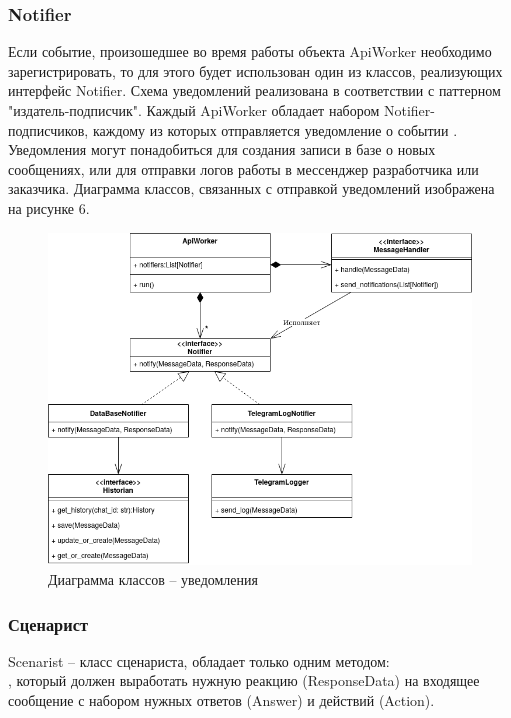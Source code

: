     \subsubsection{Notifier}
    Если событие, произошедшее во время работы объекта ApiWorker необходимо
    зарегистрировать, то для этого будет использован один из классов,
    реализующих интерфейс Notifier.
    Схема уведомлений реализована в соответствии с паттерном "издатель-подписчик".
    Каждый ApiWorker обладает набором Notifier-подписчиков, каждому из которых
    отправляется уведомление о событии .
    Уведомления могут понадобиться для создания записи в базе о новых сообщениях,
    или для отправки логов работы в мессенджер разработчика или заказчика.
    Диаграмма классов, связанных с отправкой уведомлений изображена на рисунке 6.
    \begin{figure}[H]
        \centering
        \includegraphics[width=0.9\linewidth]{static/ClassDiagram_notifiers.png}
        \caption{Диаграмма классов -- уведомления}
        \label{fig:class-diagram-notifiers}
    \end{figure}


    \subsubsection{Сценарист}
    Scenarist -- класс сценариста, обладает только одним методом:\\
    , который должен
    выработать нужную реакцию (ResponseData) на входящее сообщение с
    набором нужных ответов (Answer) и действий (Action).

